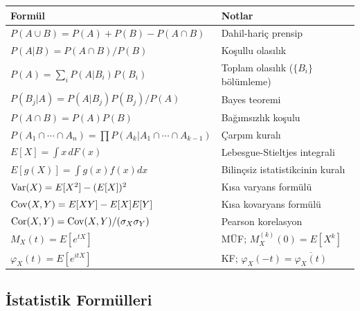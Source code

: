 \begin{center}
\renewcommand{\arraystretch}{1.5}
\small
\begin{tabular}{p{5cm}p{7cm}}
\hline
\textbf{Formül} & \textbf{Notlar} \\
\hline
$P(A\cup B)=P(A)+P(B)-P(A\cap B)$ & Dahil-hariç prensip \\
$P(A|B)=P(A\cap B)/P(B)$ & Koşullu olasılık \\
$P(A)=\sum_i P(A|B_i)P(B_i)$ & Toplam olasılık ($\{B_i\}$ bölümleme) \\
$P(B_j|A)=P(A|B_j)P(B_j)/P(A)$ & Bayes teoremi \\
$P(A\cap B)=P(A)P(B)$ & Bağımsızlık koşulu \\
$P(A_1\cap\cdots\cap A_n)=\prod P(A_k|A_1\cap\cdots\cap A_{k-1})$ & Çarpım kuralı \\
$E[X]=\int x\,dF(x)$ & Lebesgue-Stieltjes integrali \\
$E[g(X)]=\int g(x)f(x)dx$ & Bilinçsiz istatistikcinin kuralı \\
$\operatorname{Var}(X)=E[X^2]-(E[X])^2$ & Kısa varyans formülü \\
$\operatorname{Cov}(X,Y)=E[XY]-E[X]E[Y]$ & Kısa kovaryans formülü \\
$\operatorname{Cor}(X,Y)=\operatorname{Cov}(X,Y)/(\sigma_X\sigma_Y)$ & Pearson korelasyon \\
$M_X(t)=E[e^{tX}]$ & MÜF; $M_X^{(k)}(0)=E[X^k]$ \\
$\varphi_X(t)=E[e^{itX}]$ & KF; $\varphi_X(-t)=\overline{\varphi_X(t)}$ \\
\hline
\end{tabular}
\end{center}

\subsection{İstatistik Formülleri}

